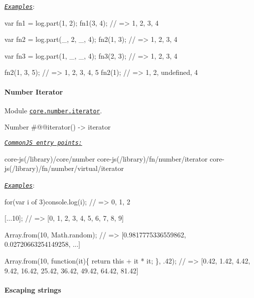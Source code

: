 \href{http://goo.gl/p9ZJ8K}{\tt {\itshape Examples}}\+: 
\begin{DoxyCode}
var fn1 = log.part(1, 2);
fn1(3, 4);    // => 1, 2, 3, 4

var fn2 = log.part(\_, 2, \_, 4);
fn2(1, 3);    // => 1, 2, 3, 4

var fn3 = log.part(1, \_, \_, 4);
fn3(2, 3);    // => 1, 2, 3, 4

fn2(1, 3, 5); // => 1, 2, 3, 4, 5
fn2(1);       // => 1, 2, undefined, 4
\end{DoxyCode}
 \paragraph*{Number Iterator}

Module \href{https://github.com/zloirock/core-js/blob/v2.6.0/modules/core.number.iterator.js}{\tt {\ttfamily core.\+number.\+iterator}}. 
\begin{DoxyCode}
Number
  #@@iterator() -> iterator
\end{DoxyCode}


\href{#commonjs}{\tt {\itshape Common\+JS entry points\+:}} 
\begin{DoxyCode}
core-js(/library)/core/number
core-js(/library)/fn/number/iterator
core-js(/library)/fn/number/virtual/iterator
\end{DoxyCode}
 \href{http://goo.gl/o45pCN}{\tt {\itshape Examples}}\+: 
\begin{DoxyCode}
for(var i of 3)console.log(i); // => 0, 1, 2

[...10]; // => [0, 1, 2, 3, 4, 5, 6, 7, 8, 9]

Array.from(10, Math.random); // => [0.9817775336559862, 0.02720663254149258, ...]

Array.from(10, function(it)\{
  return this + it * it;
\}, .42); // => [0.42, 1.42, 4.42, 9.42, 16.42, 25.42, 36.42, 49.42, 64.42, 81.42]
\end{DoxyCode}
 \paragraph*{Escaping strings}


